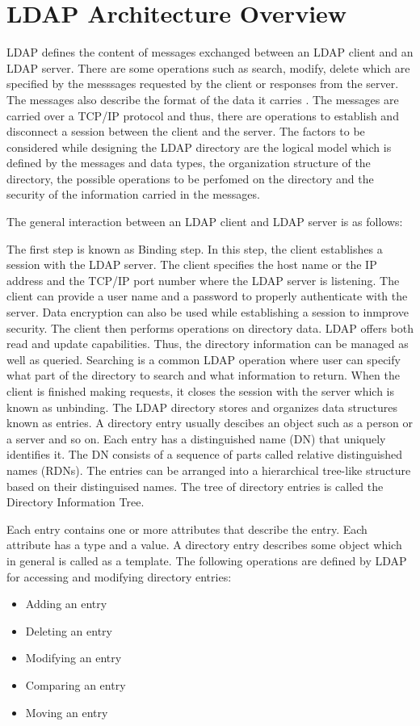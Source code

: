 \documentclass[9pt,twocolumn,twoside]{../../styles/osajnl}
\begin{document}
\section{LDAP Architecture Overview}
LDAP defines the content of messages exchanged between an LDAP client
and an LDAP server. There are some operations such as search, modify,
delete which are specified by the messsages requested by the client or
responses from the server.  The messages also describe the format of
the data it carries \cite{www-directory-organization}. The messages
are carried over a TCP/IP protocol and thus, there are operations to
establish and disconnect a session between the client and the server.
The factors to be considered while designing the LDAP directory are
the logical model which is defined by the messages and data types, the
organization structure of the directory, the possible operations to be
perfomed on the directory and the security of the information carried
in the messages.\cite{www-ldap-wikipedia}

The general interaction between an LDAP client and LDAP server is as
follows:

The first step is known as Binding step. In this step, the client
establishes a session with the LDAP server. The client specifies the
host name or the IP address and the TCP/IP port number where the LDAP
server is listening. The client can provide a user name and a password
to properly authenticate with the server. Data encryption can also be
used while establishing a session to inmprove security.  The client
then performs operations on directory data. LDAP offers both read and
update capabilities. Thus, the directory information can be managed as
well as queried. Searching is a common LDAP operation where user can
specify what part of the directory to search and what information to
return.  When the client is finished making requests, it closes the
session with the server which is known as unbinding.  The LDAP
directory stores and organizes data structures known as entries.  A
directory entry usually descibes an object such as a person or a
server and so on. Each entry has a distinguished name (DN) that
uniquely identifies it. The DN consists of a sequence of parts called
relative distinguished names (RDNs). The entries can be arranged into
a hierarchical tree-like structure based on their distinguised
names. The tree of directory entries is called the Directory
Information Tree. \cite{ldap-ibm-book}

Each entry contains one or more attributes that describe the
entry. Each attribute has a type and a value. A directory entry
describes some object which in general is called as a template.
The following operations are defined by LDAP for accessing and modifying
directory entries:
\begin{itemize}
\item Adding an entry
\item Deleting an entry
\item Modifying an entry
\item Comparing an entry
\item Moving an entry
\end{itemize}
\end{document}
